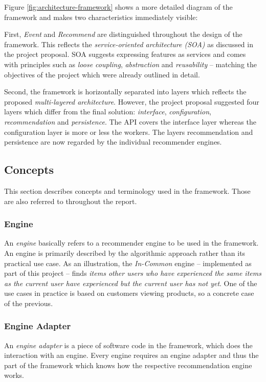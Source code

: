 Figure \ref{fig:architecture-framework} shows a more detailed diagram of the framework and makes two characteristics immediately visible:

First, \emph{Event} and \emph{Recommend} are distinguished throughout the design of the framework. This reflects the \emph{service-oriented architecture (SOA)} as discussed in the project proposal. SOA suggests expressing features as services and comes with principles such as \emph{loose coupling}, \emph{abstraction} and \emph{reusability} -- matching the objectives of the project which were already outlined in detail.

Second, the framework is horizontally separated into layers which reflects the proposed \emph{multi-layered architecture}. However, the project proposal suggested four layers which differ from the final solution: \emph{interface}, \emph{configuration}, \emph{recommendation} and \emph{persistence}. The API covers the interface layer whereas the configuration layer is more or less the workers. The layers recommendation and persistence are now regarded by the individual recommender engines.

\subsection{Concepts}

This section describes concepts and terminology used in the framework. Those are also referred to throughout the report.

\subsubsection{Engine}

An \emph{engine} basically refers to a recommender engine to be used in the framework. An engine is primarily described by the algorithmic approach rather than its practical use case. As an illustration, the \emph{In-Common} engine -- implemented as part of this project -- finds \emph{items other users who have experienced the same items as the current user have experienced but the current user has not yet}. One of the use cases in practice is based on customers viewing products, so a concrete case of the previous.

\subsubsection{Engine Adapter}

An \emph{engine adapter} is a piece of software code in the framework, which does the interaction with an engine. Every engine requires an engine adapter and thus the part of the framework which knows how the respective recommendation engine works.

